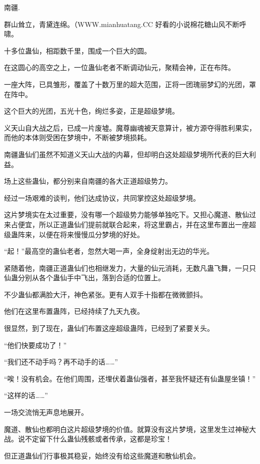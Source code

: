 
\begin{this_body}

南疆.

群山耸立，青黛连绵。（WWW.mianhuatang.CC 好看的小说棉花糖山风不断呼啸。

十多位蛊仙，相距数千里，围成一个巨大的圆。

在这圆心的高空之上，一位蛊仙老者不断调动仙元，聚精会神，正在布阵。

一座大阵，已具雏形，覆盖了十数万里的超大范围，正将一团瑰丽梦幻的光团，罩在阵中。

这个巨大的光团，五光十色，绚烂多姿，正是超级梦境。

义天山自大战之后，已成一片废墟。魔尊幽魂被天意算计，被方源夺得胜利果实，而他的本体则受困在梦境中，不断被梦境损耗。

南疆蛊仙们虽然不知道义天山大战的内幕，但却明白这处超级梦境所代表的巨大利益。

场上这些蛊仙，都分别来自南疆的各大正道超级势力。

经过一场艰难的谈判，他们达成协议，共同掌控这处超级梦境。

这片梦境实在太过重要，没有哪一个超级势力能够单独吃下。又担心魔道、散仙过来占便宜，所以正道蛊仙们提前就联合起来，将这里霸占，并在这里布置出一座超级蛊阵来，以便在将来慢慢瓜分梦境的好处。

“起！”最高空的蛊仙老者，忽然大喝一声，全身绽射出无边的华光。

紧随着他，南疆正道蛊仙们也相继发力，大量的仙元消耗，无数凡蛊飞舞，一只只仙蛊分别从各个蛊仙手中飞出，落到合适的位置上。

不少蛊仙都满脸大汗，神色紧张。更有人双手十指都在微微颤抖。

他们在这里布置蛊阵，已经持续了九天九夜。

很显然，到了现在，蛊仙们布置这座超级蛊阵，已经到了紧要关头。

“他们快要成功了！”

“我们还不动手吗？再不动手的话……”

“唉！没有机会。在他们周围，还埋伏着蛊仙强者，甚至我怀疑还有仙蛊屋坐镇！”

“这样的话……”

一场交流悄无声息地展开。

魔道、散仙也都明白这片超级梦境的价值。就算没有这片梦境，这里发生过神秘大战。说不定留下什么蛊仙残骸或者传承，这都是珍宝！

但正道蛊仙们行事极其稳妥，始终没有给这些魔道和散仙机会。


\end{this_body}
